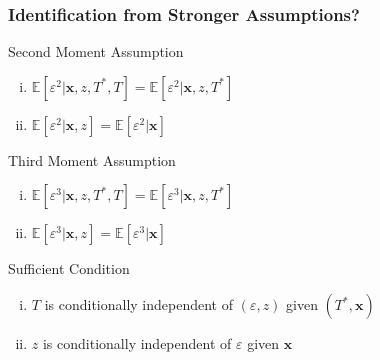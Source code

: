 \documentclass{beamer}
\begin{document}
\begin{frame}
  \frametitle{Identification from Stronger Assumptions?}

  \begin{block}{Second Moment Assumption}
    \begin{enumerate}[(i)]
    \item $\mathbb{E}[\varepsilon^2|\mathbf{x},z,T^*,T] = \mathbb{E}[\varepsilon^2|\mathbf{x},z, T^*]$
    \item $\mathbb{E}[\varepsilon^2|\mathbf{x},z] = \mathbb{E}[\varepsilon^2|\mathbf{x}]$
  \end{enumerate}
  \end{block}

  \begin{block}{Third Moment Assumption}
    \begin{enumerate}[(i)]
    \item $\mathbb{E}[\varepsilon^3|\mathbf{x},z,T^*,T] = \mathbb{E}[\varepsilon^3|\mathbf{x},z, T^*]$
    \item $\mathbb{E}[\varepsilon^3|\mathbf{x},z] = \mathbb{E}[\varepsilon^3|\mathbf{x}]$
  \end{enumerate}
  \end{block}

  \begin{alertblock}{Sufficient Condition}
    \begin{enumerate}[(i)]
      \item $T$ is conditionally independent of $(\varepsilon,z)$ given $(T^*,\mathbf{x})$
      \item $z$ is conditionally independent of $\varepsilon$ given $\mathbf{x}$
    \end{enumerate}
  \end{alertblock}
  
\end{frame}
\end{document}

